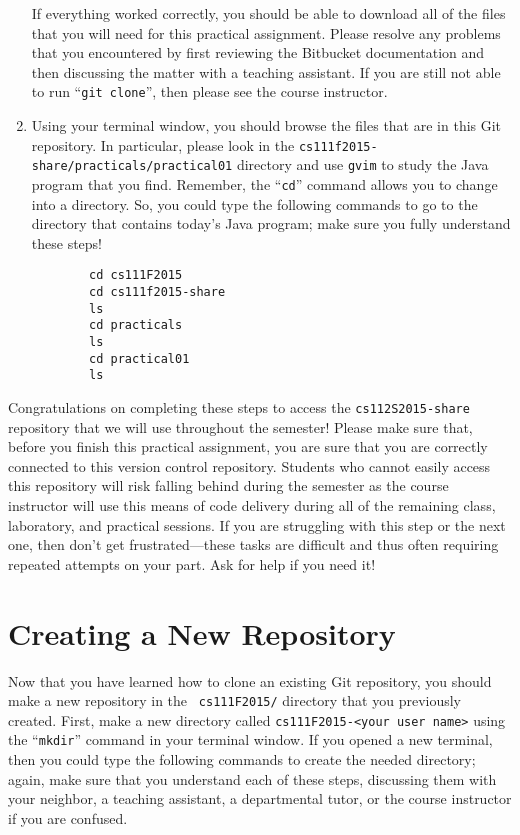 \begin{enumerate}
    If everything worked correctly, you should be able to download all of the files that you will need for this
    practical assignment. Please resolve any problems that you encountered by first reviewing the Bitbucket
    documentation and then discussing the matter with a teaching assistant.  If you are still not able to run ``{\tt git
      clone}'', then please see the course instructor.

  \item Using your terminal window, you should browse the files that are in this Git repository.  In particular, please
    look in the {\tt cs111f2015-share/practicals/practical01} directory and use {\tt gvim} to study the Java program that
    you find.  Remember, the ``{\tt cd}'' command allows you to change into a directory. So, you could type the following
    commands to go to the directory that contains today's Java program; make sure you fully understand these steps!

    \vspace*{-.1in}
    \begin{verbatim}
        cd cs111F2015
        cd cs111f2015-share
        ls
        cd practicals
        ls
        cd practical01
        ls
    \end{verbatim}
    \vspace*{-.5in}

    \end{enumerate}

    Congratulations on completing these steps to access the {\tt cs112S2015-share} repository that we will use
    throughout the semester! Please make sure that, before you finish this practical assignment, you are sure that you
    are correctly connected to this version control repository. Students who cannot easily access this repository will
    risk falling behind during the semester as the course instructor will use this means of code delivery during all of
    the remaining class, laboratory, and practical sessions. If you are struggling with this step or the next one, then
    don't get frustrated---these tasks are difficult and thus often requiring repeated attempts on your part. Ask for
    help if you need it!

\section*{Creating a New Repository}

Now that you have learned how to clone an existing Git repository, you should make a new repository in the {\tt
cs111F2015/} directory that you previously created.  First, make a new directory called {\tt cs111F2015-<your user
name>} using the ``{\tt mkdir}'' command in your terminal window. If you opened a new terminal, then you could type the
following commands to create the needed directory; again, make sure that you understand each of these steps, discussing
them with your neighbor, a teaching assistant, a departmental tutor, or the course instructor if you are confused.


